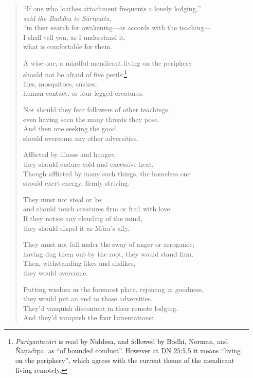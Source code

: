 \documentclass[12pt,openany]{book}%
\newcommand*{\scspeaker}[1]{\hspace{2em}\textit{#1}}
\begin{document}
\begin{verse}
“If one who loathes attachment frequents a lonely lodging,” \\
\scspeaker{said the Buddha to \textsanskrit{Sāriputta}, }\\
“in their search for awakening—as accords with the teaching—\\
I shall tell you, as I understand it, \\
what is comfortable for them. 

A wise one, a mindful mendicant living on the periphery \\
should not be afraid of five perils:\footnote{\textit{\textsanskrit{Pariyantacārī}} is read by Niddesa, and followed by Bodhi, Norman, and \textsanskrit{Ñāṇadīpa}, as “of bounded conduct”. However at \href{https://suttacentral.net/dn25/en/sujato\#5.5}{DN 25:5.5} it means “living on the periphery”, which agrees with the current theme of the mendicant living remotely. } \\
flies, mosquitoes, snakes, \\
human contact, or four-legged creatures. 

Nor should they fear followers of other teachings, \\
even having seen the many threats they pose. \\
And then one seeking the good \\
should overcome any other adversities. 

Afflicted by illness and hunger, \\
they should endure cold and excessive heat. \\
Though afflicted by many such things, the homeless one \\
should exert energy, firmly striving. 

They must not steal or lie; \\
and should touch creatures firm or frail with love. \\
If they notice any clouding of the mind, \\
they should dispel it as \textsanskrit{Māra}’s ally. 

They must not fall under the sway of anger or arrogance; \\
having dug them out by the root, they would stand firm. \\
Then, withstanding likes and dislikes, \\
they would overcome. 

Putting wisdom in the foremost place, rejoicing in goodness, \\
they would put an end to those adversities. \\
They’d vanquish discontent in their remote lodging. \\
And they’d vanquish the four lamentations: 


\end{verse}
\end{document}

